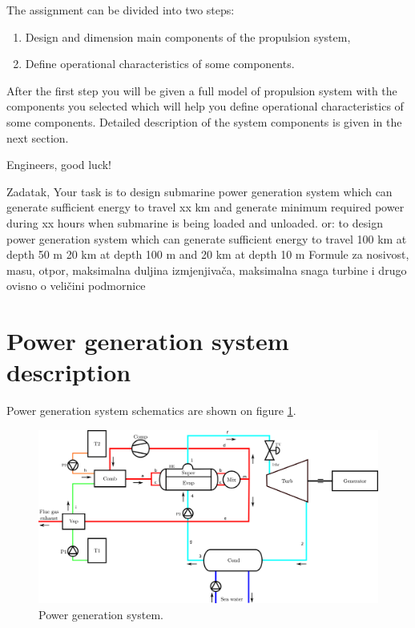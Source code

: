 \documentclass{article}
\begin{document}
	The assignment can be divided into two steps: 
	
	\begin{enumerate}
		\item Design and dimension main components of the propulsion system,
		\item Define operational characteristics of some components.
	\end{enumerate}

	After the first step you will be given a full model of propulsion system with the components you selected which will help you define operational characteristics of some components.
	Detailed description of the system components is given in the next section.
	
	Engineers, good luck!
	
	Zadatak,
	Your task is to design submarine power generation system which can generate sufficient energy to travel xx km and generate minimum required power during xx hours when submarine is being loaded and unloaded.
	or: to design power generation system which can generate sufficient energy to travel 100 km at depth 50 m 20 km at depth  100 m and 20 km at depth 10 m
	Formule za nosivost, masu, otpor, maksimalna duljina izmjenjivača, maksimalna snaga turbine i drugo ovisno o veličini podmornice
		
	\newpage
	\section{Power generation system description}
	
	Power generation system schematics are shown on figure \ref{fig:pwr_scheme}.
	
	\begin{figure}[h!]
		\centering
		\includegraphics[width=\textwidth]{terma.png}
		\caption{Power generation system.}
		\label{fig:pwr_scheme}
	\end{figure}
	
\end{document}
